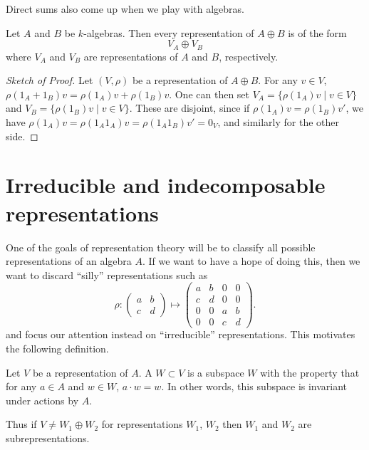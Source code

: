 Direct sums also come up when we play with algebras.
\begin{proposition}
	\label{prop:rep_direct_sum}
	Let $A$ and $B$ be $k$-algebras.
	Then every representation of $A \oplus B$ is of the form 
	\[ V_A \oplus V_B \]
	where $V_A$ and $V_B$ are representations of $A$ and $B$, respectively.
\end{proposition}
\begin{proof}[Sketch of Proof]
	Let $(V, \rho)$ be a representation of $A \oplus B$.
	For any $v \in V$, $\rho(1_A+1_B)v = \rho(1_A)v + \rho(1_B)v$.
	One can then set $V_A = \{ \rho(1_A)v \mid v \in V \}$
	and $V_B = \{ \rho(1_B)v \mid v \in V \}$.
	These are disjoint, since if $\rho(1_A) v = \rho(1_B) v'$,
	we have $\rho(1_A)v = \rho(1_A1_A)v = \rho(1_A1_B) v' = 0_V$,
	and similarly for the other side.
\end{proof}

\section{Irreducible and indecomposable representations}

One of the goals of representation theory will be to classify
all possible representations of an algebra $A$.
If we want to have a hope of doing this,
then we want to discard ``silly'' representations such as
\[
	\rho : 
	\begin{pmatrix} a & b \\ c & d \end{pmatrix} 
	\mapsto
	\begin{pmatrix} a & b & 0 & 0 \\ c & d & 0 & 0 \\
		0 & 0 & a & b \\ 0 & 0 & c & d \end{pmatrix} .
\]
and focus our attention instead on ``irreducible'' representations.
This motivates the following definition.

\begin{definition}
	Let $V$ be a representation of $A$.
	A  $W \subset V$ is a subspace $W$
	with the property that for any $a \in A$ and $w \in W$,
	$a \cdot w = w$.
	In other words, this subspace is invariant under actions by $A$.
\end{definition}
Thus if $V \neq W_1 \oplus W_2$ for representations $W_1$, $W_2$
then $W_1$ and $W_2$ are subrepresentations.

